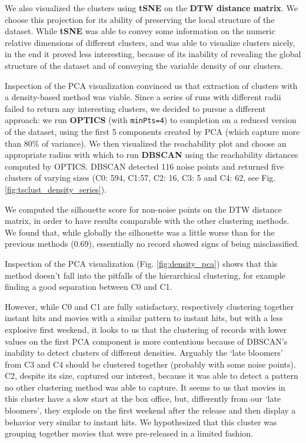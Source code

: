 We also visualized the clusters using \textbf{tSNE} on the \textbf{DTW distance matrix}.
We choose this projection for its ability of preserving the local structure of the dataset.
While \textbf{tSNE} was able to convey some information on the numeric relative dimensions of different clusters, and was able to visualize clusters nicely, in the end it proved less interesting, because of its inability of revealing the global structure of the dataset and of conveying the variable density of our clusters.

Inspection of the PCA visualization convinced us that extraction of clusters with a density-based method was viable.
Since a series of runs with different radii failed to return any interesting clusters, we decided to pursue a different approach: we run \textbf{OPTICS} (with \texttt{minPts=4}) to completion on a reduced version of the dataset, using the first 5 components created by PCA (which capture more than 80\% of variance). We then visualized the reachability plot and choose an appropriate radius with which to run \textbf{DBSCAN} using the reachability distances computed by OPTICS.
DBSCAN detected 116 noise points and returned five clusters of varying sizes (C0: 594, C1:57, C2: 16, C3: 5 and C4: 62, see Fig. \ref{fig:tsclust_density_series}).

We computed the silhouette score for non-noise points on the DTW distance matrix, in order to have results comparable with the other clustering methods.
We found that, while globally the silhouette was a little worse than for the previous methods (0.69), essentially no record showed signs of being misclassified.

Inspection of the PCA visualization (Fig. \ref{fig:density_pca}) shows that this method doesn't fall into the pitfalls of the hierarchical clustering, for example finding a good separation between C0 and C1.

However, while C0 and C1 are fully satisfactory, respectively clustering together instant hits and movies with a similar pattern to instant hits, but with a less explosive first weekend, it looks to us that the clustering of records with lower values on the first PCA component is more contentious because of DBSCAN's inability to detect clusters of different densities.
Arguably the `late bloomers' from C3 and C4 should be clustered together (probably with some noise points).
C2, despite its size, captured our interest, because it was able to detect a pattern no other clustering method was able to capture. It seems to us that movies in this cluster have a slow start at the box office, but, differently from our `late bloomers', they explode on the first weekend after the release and then display a behavior very similar to instant hits.
We hypothesized that this cluster was grouping together movies that were pre-released in a limited fashion.

